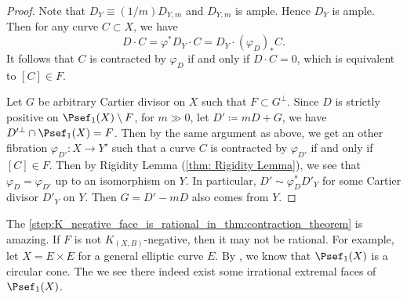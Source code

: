 \begin{proof}
        Note that \(D_Y \equiv (1/m) D_{Y,m}\) and \(D_{Y,m}\) is ample.
        Hence \(D_Y\) is ample.
        Then for any curve \(C \subset X\), we have
        \[ D \cdot C = \varphi^* D_Y \cdot C = D_Y \cdot (\varphi_D)_* C. \]
        It follows that \(C\) is contracted by \(\varphi_D\) if and only if \(D \cdot C = 0\), which is equivalent to \([C] \in F\).

        Let \(G\) be arbitrary Cartier divisor on \(X\) such that \(F \subset G^\perp\).
        Since \(D\) is strictly positive on \(\Psef_1(X) \setminus F\), for \(m \gg 0\), let \(D'\coloneqq mD+G\), we have \(D'^\perp \cap \Psef_1(X) = F\).
        Then by the same argument as above, we get an other fibration \(\varphi_{D'}: X \to Y'\) such that a curve \(C\) is contracted by \(\varphi_{D'}\) if and only if \([C] \in F\).
        Then by Rigidity Lemma (\cref{thm: Rigidity Lemma}), we see that \(\varphi_D = \varphi_{D'}\) up to an isomorphism on \(Y\).
        In particular, \(D' \sim \varphi_D^* D'_Y\) for some Cartier divisor \(D'_Y\) on \(Y\).
        Then \(G = D' - mD\) also comes from \(Y\).
    \end{proof}
    \begin{remark}\label{rmk_K_negative_face_is_rational}
        The \cref{step:K_negative_face_is_rational_in_thm:contraction_theorem} is amazing.
        If \(F\) is not \(K_{(X,B)}\)-negative, then it may not be rational.
        For example, let \(X = E \times E\) for a general elliptic curve \(E\).
        By \cite[Lemma 1.5.4]{Laz04a}, we know that \(\Psef_1(X)\) is a circular cone.
        The we see there indeed exist some irrational extremal faces of \(\Psef_1(X)\).
    \end{remark}

